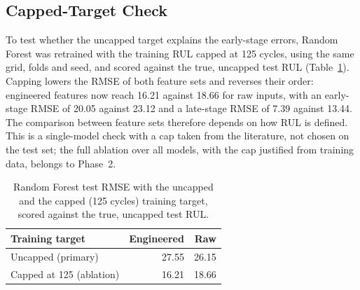 \subsection{Capped-Target Check}
\label{sec:capped}
To test whether the uncapped target explains the early-stage errors, Random
Forest was retrained with the training RUL capped at 125 cycles, using the same
grid, folds and seed, and scored against the true, uncapped test RUL
(Table~\ref{tab:capped}). Capping lowers the RMSE of both feature sets and
reverses their order: engineered features now reach 16.21 against 18.66 for raw
inputs, with an early-stage RMSE of 20.05 against 23.12 and a late-stage RMSE of
7.39 against 13.44. The comparison between feature sets therefore depends on how
RUL is defined. This is a single-model check with a cap taken from the
literature, not chosen on the test set; the full ablation over all models, with
the cap justified from training data, belongs to Phase~2.

\begin{table}[!t]
\centering
\caption{Random Forest test RMSE with the uncapped and the capped (125 cycles)
training target, scored against the true, uncapped test RUL.}
\label{tab:capped}
\begin{tabular}{lrr}
\hline
Training target & Engineered & Raw \\
\hline
Uncapped (primary)      & 27.55 & 26.15 \\
Capped at 125 (ablation) & 16.21 & 18.66 \\
\hline
\end{tabular}
\end{table}
